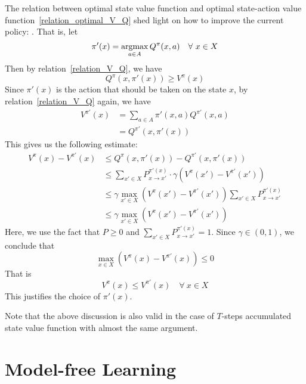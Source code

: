 The relation between optimal state value function and optimal state-action value 
function~\eqref{relation_optimal_V_Q} shed light on how to improve the current policy: . That is, let 
\begin{equation}
\pi'(x) = \operatorname*{argmax}_{a \in A}Q^\pi(x, a)\quad\forall~x \in X
\end{equation}
Then by relation~\eqref{relation_V_Q}, we have
$$Q^\pi(x, \pi'(x)) \geqslant V^\pi(x)$$
Since $\pi'(x)$ is the action that should be taken on the state $x$, by relation~\eqref{relation_V_Q} again, 
we have
\begin{align*}
    V^{\pi'}(x) &= \sum_{a \in A}\pi'(x, a) Q^{\pi'}(x, a)\\
              &= Q^{\pi'}(x, \pi'(x))
\end{align*}
This gives us the following estimate:
\begin{align*}
    V^\pi(x) - V^{\pi'}(x) &\leqslant Q^\pi(x, \pi'(x)) - Q^{\pi'}(x, \pi'(x))\\
                           &\leqslant \sum_{x' \in X}P_{x \rightarrow x'}^{\pi'(x)}\cdot\gamma\left(V^\pi(x') - 
                           V^{\pi'}(x')\right)\\
                           &\leqslant \gamma \max_{x' \in X}\left(V^\pi(x') - V^{\pi'}(x')\right)\sum_{x' \in X}
                           P_{x \rightarrow x'}^{\pi'(x)}\\
                           &\leqslant \gamma \max_{x' \in X}\left(V^\pi(x') - V^{\pi'}(x')\right)
\end{align*}
Here, we use the fact that $P \geq 0$ and $\sum_{x' \in X}P_{x \rightarrow x'}^{\pi'(x)} = 1$. Since
$\gamma \in (0, 1)$, we conclude that
$$\max_{x \in X}\left(V^\pi(x) - V^{\pi'}(x)\right) \leqslant 0$$
That is 
$$V^\pi(x) \leqslant V^{\pi'}(x)\quad\forall~x \in X$$
This justifies the choice of $\pi'(x)$.
\begin{re}
    Note that the above discussion is also valid in the case of $T$-steps accumulated state value function
    with almost the same argument.
\end{re}



\section{Model-free Learning}